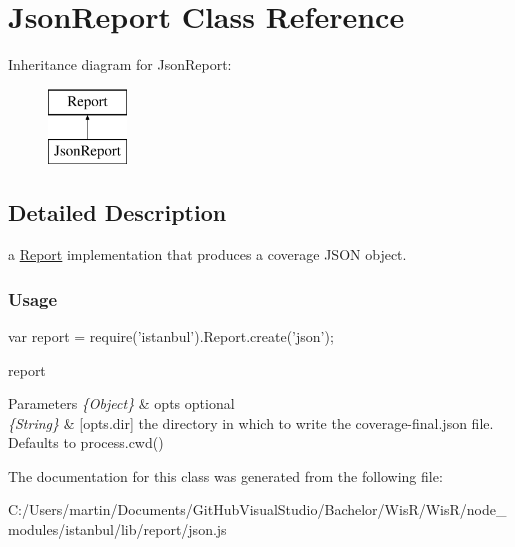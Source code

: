 \hypertarget{class_json_report}{}\section{Json\+Report Class Reference}
\label{class_json_report}
Inheritance diagram for Json\+Report\+:\begin{figure}[H]
\begin{center}
\leavevmode
\includegraphics[height=2.000000cm]{class_json_report}
\end{center}
\end{figure}


\subsection{Detailed Description}
a {\ttfamily \hyperlink{class_report}{Report}} implementation that produces a coverage J\+S\+O\+N object.

\subsubsection*{Usage }

\begin{DoxyVerb} var report = require('istanbul').Report.create('json');
\end{DoxyVerb}


report  
\begin{DoxyParams}{Parameters}
{\em \{\+Object\}} & opts optional \\
\hline
{\em \{\+String\}} & \mbox{[}opts.\+dir\mbox{]} the directory in which to write the {\ttfamily coverage-\/final.\+json} file. Defaults to {\ttfamily process.\+cwd()} \\
\hline
\end{DoxyParams}


The documentation for this class was generated from the following file\+:\begin{DoxyCompactItemize}
\item 
C\+:/\+Users/martin/\+Documents/\+Git\+Hub\+Visual\+Studio/\+Bachelor/\+Wis\+R/\+Wis\+R/node\+\_\+modules/istanbul/lib/report/json.\+js\end{DoxyCompactItemize}
